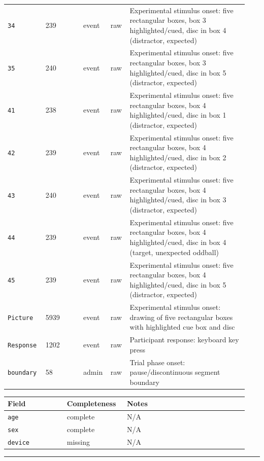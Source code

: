 {\begin{tcolorbox}
\begin{tabular}{@{}p{0.1567\linewidth}p{0.1567\linewidth}p{0.0783\linewidth}p{0.0783\linewidth}p{0.4700\linewidth}@{}}
\texttt{34} & 239 & event & raw & Experimental stimulus onset: five rectangular boxes, box 3 highlighted/cued, disc in box 4 (distractor, expected) \\
\texttt{35} & 240 & event & raw & Experimental stimulus onset: five rectangular boxes, box 3 highlighted/cued, disc in box 5 (distractor, expected) \\
\texttt{41} & 238 & event & raw & Experimental stimulus onset: five rectangular boxes, box 4 highlighted/cued, disc in box 1 (distractor, expected) \\
\texttt{42} & 239 & event & raw & Experimental stimulus onset: five rectangular boxes, box 4 highlighted/cued, disc in box 2 (distractor, expected) \\
\texttt{43} & 240 & event & raw & Experimental stimulus onset: five rectangular boxes, box 4 highlighted/cued, disc in box 3 (distractor, expected) \\
\texttt{44} & 239 & event & raw & Experimental stimulus onset: five rectangular boxes, box 4 highlighted/cued, disc in box 4 (target, unexpected oddball) \\
\texttt{45} & 239 & event & raw & Experimental stimulus onset: five rectangular boxes, box 4 highlighted/cued, disc in box 5 (distractor, expected) \\
\texttt{Picture} & 5939 & event & raw & Experimental stimulus onset: drawing of five rectangular boxes with highlighted cue box and disc \\
\texttt{Response} & 1202 & event & raw & Participant response: keyboard key press \\
\texttt{boundary} & 58 & admin & raw & Trial phase onset: pause/discontinuous segment boundary \\
\bottomrule
\end{tabular}
\endgroup
\smallskip{}\par\smallskip
\begingroup\scriptsize\setlength{\tabcolsep}{2pt}
\begin{tabular}{@{}p{0.2350\linewidth}p{0.2350\linewidth}p{0.4700\linewidth}@{}}
\toprule
\textbf{Field} & \textbf{Completeness} & \textbf{Notes} \\
\midrule
\texttt{age} & complete & N/A \\
\texttt{sex} & complete & N/A \\
\texttt{device} & missing & N/A \\
\bottomrule
\end{tabular}
\endgroup
\noindent\rule{\linewidth}{0.7pt}\par\nopagebreak

\end{tcolorbox}}
